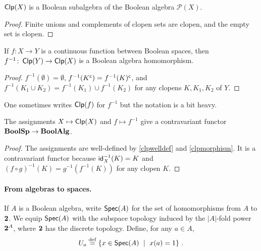 \begin{proposition}\label{clpwelldef}\leanok
    $\operatorname*{\mathsf{Clp}}(X)$ is a Boolean subalgebra of the Boolean algebra $\mathcal{P}(X)$.
\end{proposition}
\begin{proof}
    Finite unions and complements of clopen sets are clopen, and the empty set
    is clopen.
\end{proof} 
\begin{proposition}\label{clpmorphism}\leanok
    If $f \colon X \to Y$ is a continuous function between Boolean spaces, then
    $f^{-1} \colon \operatorname*{\mathsf{Clp}}(Y) \to \operatorname*{\mathsf{Clp}}(X)$ is a Boolean algebra homomorphism.
\end{proposition}
\begin{proof}
    $f^{-1}(\emptyset) = \emptyset$, $f^{-1}(K^{\mathsf{c}}) = f^{-1}(K)^{\mathsf{c}}$, and
    $f^{-1}(K_1 \cup K_2) = f^{-1}(K_1) \cup f^{-1}(K_2)$ for any clopens $K,
    K_1, K_2$ of $Y$. 
\end{proof}
One sometimes writes $\operatorname*{\mathsf{Clp}}(f)$ for $f^{-1}$ but the notation is a bit heavy.
\begin{proposition}
    The assignments $X \mapsto \operatorname*{\mathsf{Clp}}(X)$ and $f \mapsto f^{-1}$ give a
contravariant functor $\mathbf{BoolSp} \to \mathbf{BoolAlg}$.
\end{proposition}
\begin{proof}
    The assignments are well-defined by \cref{clpwelldef} and
    \cref{clpmorphism}. It is a contravariant functor because
    $\mathsf{id}_X^{-1}(K) = K$ and $(f \circ g)^{-1}(K) = g^{-1}(f^{-1}(K))$ for
    any clopen $K$.
\end{proof}

\paragraph{From algebras to spaces.}
If $A$ is a Boolean algebra, write $\operatorname*{\mathsf{Spec}}(A)$ for the set of homomorphisms from
$A$ to $\mathbf{2}$. We equip $\operatorname*{\mathsf{Spec}}(A)$ with the subspace topology induced by the
$|A|$-fold power $\mathbf{2}^{A}$, where $\mathbf{2}$ has the discrete topology.
Define, for any $a \in A$,
\[ U_a \stackrel{\mathrm{def}}{=} \{ x \in \operatorname*{\mathsf{Spec}}(A) \ \mid \ x(a) = 1 \} \ . \]

